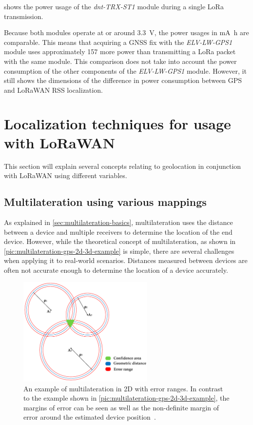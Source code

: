  shows the power usage of the \emph{dnt-TRX-ST1} module during a single \ac{LoRa} transmission.

Because both modules operate at or around \SI{3.3}{\volt}, the power usages in \si{\milli\ampere\hour} are comparable.
This means that acquiring a \ac{GNSS} fix with the \emph{ELV-LW-GPS1} module uses approximately \SI{157}{\times} more power than transmitting a \ac{LoRa} packet with the same module.
This comparison does not take into account the power consumption of the other components of the \emph{ELV-LW-GPS1} module.
However, it still shows the dimensions of the difference in power consumption between \ac{GPS} and \ac{LoRaWAN} \ac{RSS} localization.

\section{Localization techniques for usage with \acs{LoRaWAN}}\label{sec:lorawan-localization-techniques}

This section will explain several concepts relating to geolocation in conjunction with \ac{LoRaWAN} using different variables.

\subsection{Multilateration using various mappings}\label{sec:lorawan-multilateration}

As explained in \cref{sec:multilateration-basics}, multilateration uses the distance between a device and multiple receivers to determine the location of the end device.
However, while the theoretical concept of multilateration, as shown in \cref{pic:multilateration-gps-2d-3d-example} is simple, there are several challenges when applying it to real-world scenarios.
Distances measured between devices are often not accurate enough to determine the location of a device accurately.

\begin{figure}[htbp]
    \centering
    \includegraphics[width=0.6\textwidth]{pictures/multilateration/multilateration_error_ranges.png}
    \caption{
        An example of multilateration in 2D with error ranges.
        In contrast to the example shown in \cref{pic:multilateration-gps-2d-3d-example}, the margins of error can be seen as well as the non-definite margin of error around the estimated device position~\protect\cite{kapoor_novel_2016}.
    }\label{pic:multilateration-with-error-ranges-example}
\end{figure}

